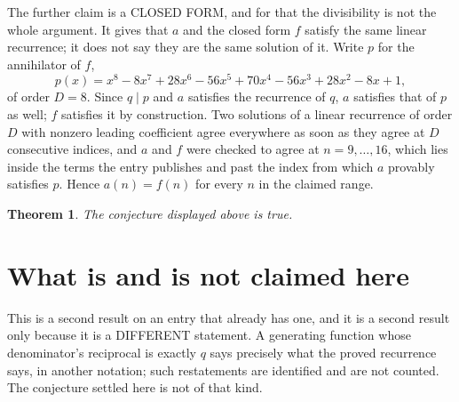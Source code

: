 \documentclass[11pt,a4paper]{article}
\theoremstyle{plain}
\newtheorem{theorem}{Theorem}
\theoremstyle{definition}
\begin{document}
The further claim is a CLOSED FORM, and for that the divisibility is not the whole argument. It
gives that $a$ and the closed form $f$ satisfy the same linear recurrence; it does not say they
are the same solution of it. Write $p$ for the annihilator of $f$,
\[
  p(x)=x^{8} - 8 x^{7} + 28 x^{6} - 56 x^{5} + 70 x^{4} - 56 x^{3} + 28 x^{2} - 8 x + 1 ,
\]
of order $D=8$. Since $q\mid p$ and $a$ satisfies the recurrence of $q$, $a$ satisfies that of
$p$ as well; $f$ satisfies it by construction. Two solutions of a linear recurrence of order $D$
with nonzero leading coefficient agree everywhere as soon as they agree at $D$ consecutive
indices, and $a$ and $f$ were checked to agree at $n=9,\dots,16$,
which lies inside the terms the entry publishes and past the index from which $a$ provably
satisfies $p$. Hence $a(n)=f(n)$ for every $n$ in the claimed range.

\begin{theorem}
The conjecture displayed above is true.
\end{theorem}

\section{What is and is not claimed here}

This is a second result on an entry that already has one, and it is a second result only because
it is a DIFFERENT statement. A generating function whose denominator's reciprocal is exactly $q$
says precisely what the proved recurrence says, in another notation; such restatements are
identified and are not counted. The conjecture settled here is not of that kind.
\end{document}

